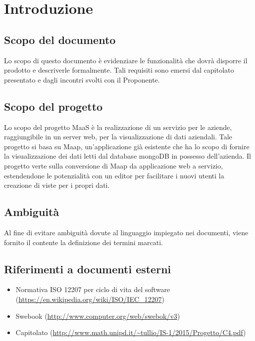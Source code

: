 \section{Introduzione}
\subsection{Scopo del documento}
Lo scopo di questo documento è evidenziare le funzionalit\`a che dovr\`a disporre il prodotto e descriverle formalmente. Tali requisiti sono emersi dal capitolato presentato e dagli incontri svolti con il Proponente.

\subsection{Scopo del progetto}
Lo scopo del progetto MaaS è la realizzazione di un servizio per le aziende, raggiungibile in un server web, per la visualizzazione di dati aziendali. Tale progetto si basa su Maap, un'applicazione già esistente che ha lo scopo di fornire la visualizzazione dei dati letti dal database mongoDB in possesso dell'azienda. Il progetto verte sulla conversione di Maap da applicazione web a servizio, estendendone le potenzialità con un editor per facilitare i nuovi utenti la creazione di viste per i propri dati.

\subsection{Ambiguit\`a}
Al fine di evitare ambiguità dovute al linguaggio impiegato nei documenti, viene fornito il \Glossario contente la definizione dei termini marcati.

\subsection{Riferimenti a documenti esterni}
\begin{itemize}
\item Normativa ISO 12207 per ciclo di vita del software (\url{https://en.wikipedia.org/wiki/ISO/IEC_12207})
\item Swebook (\url{http://www.computer.org/web/swebok/v3})
\item Capitolato (\url{http://www.math.unipd.it/~tullio/IS-1/2015/Progetto/C4.pdf})
\end{itemize}

